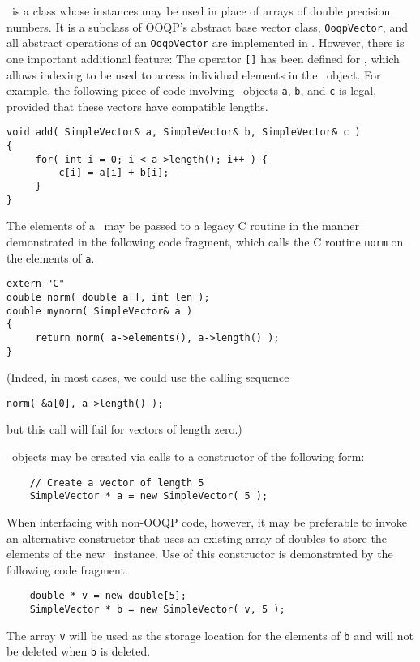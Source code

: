 \SimpleVector\ is a class whose instances may be used in place of
arrays of double precision numbers. It is a subclass of OOQP's
abstract base vector class, \texttt{OoqpVector}, and all abstract
operations of an \texttt{OoqpVector} are implemented in \SimpleVector.
However, there is one important additional feature: The operator
\verb-[]- has been defined for \SimpleVector, which allows indexing to
be used to access individual elements in the \SimpleVector\ object.
For example, the following piece of code involving \SimpleVector\
objects {\tt a}, {\tt b}, and {\tt c} is legal, provided that these
vectors have compatible lengths.
\begin{verbatim}
void add( SimpleVector& a, SimpleVector& b, SimpleVector& c )
{
     for( int i = 0; i < a->length(); i++ ) {
         c[i] = a[i] + b[i];
     }
}
\end{verbatim}

The elements of a \SimpleVector\ may be passed to a legacy C routine
in the manner demonstrated in the following code fragment, which calls
the C routine \texttt{norm} on the elements of \texttt{a}.
\begin{verbatim}
extern "C"
double norm( double a[], int len );
double mynorm( SimpleVector& a )
{
     return norm( a->elements(), a->length() );
}
\end{verbatim}
(Indeed, in most cases, we could use the calling sequence
\begin{verbatim}
norm( &a[0], a->length() );
\end{verbatim}
but this call will fail for vectors of length zero.) 

\SimpleVector\ objects may be created via calls to a constructor of the
following form:
\begin{verbatim}
    // Create a vector of length 5
    SimpleVector * a = new SimpleVector( 5 );
\end{verbatim}
When interfacing with non-OOQP code, however, it may be preferable to
invoke an alternative constructor that uses an existing array of
doubles to store the elements of the new \SimpleVector\ instance. Use
of this constructor is demonstrated by the following code fragment.
\begin{verbatim}
    double * v = new double[5];
    SimpleVector * b = new SimpleVector( v, 5 );
\end{verbatim}
The array \texttt{v} will be used as the storage location for the
elements of \texttt{b} and will not be deleted when \texttt{b} is
deleted.

